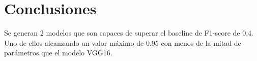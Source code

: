 \documentclass[12pt]{article}
\begin{document}
    \section{Conclusiones}

    Se generan 2 modelos que son capaces de superar el baseline de F1-score de 0.4. Uno de ellos alcanzando un valor
    máximo de 0.95 con menos de la mitad de parámetros que el modelo VGG16.


    \newpage
    
    
\end{document}

